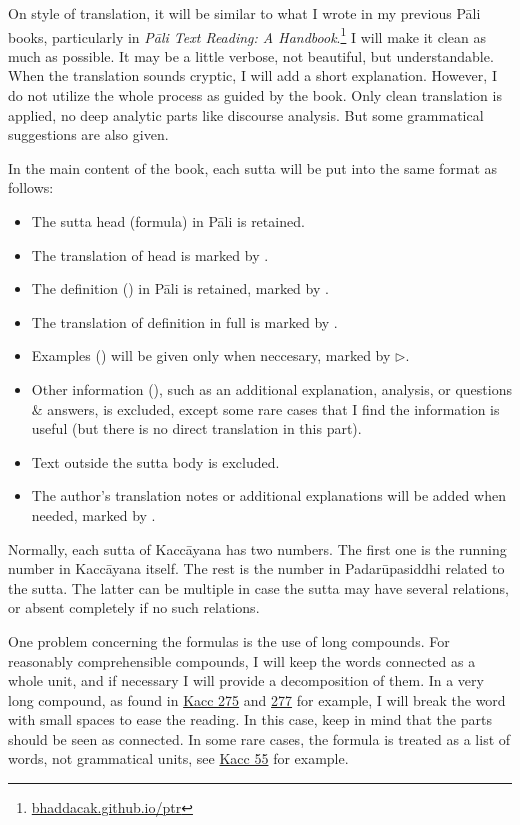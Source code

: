 On style of translation, it will be similar to what I wrote in my previous Pāli books, particularly in \emph{Pāli Text Reading: A Handbook}.\footnote{\url{bhaddacak.github.io/ptr}} I will make it clean as much as possible. It may be a little verbose, not beautiful, but understandable. When the translation sounds cryptic, I will add a short explanation. However, I do not utilize the whole process as guided by the book. Only clean translation is applied, no deep analytic parts like discourse analysis. But some grammatical suggestions are also given.

In the main content of the book, each sutta will be put into the same format as follows:

\begin{itemize}
\item The sutta head (formula) in Pāli is retained.
\item The translation of head is marked by \faHeart[regular].
\item The definition () in Pāli is retained, marked by \faAngleRight.
\item The translation of definition in full is marked by \faAngleDoubleRight.
\item Examples () will be given only when neccesary, marked by $\triangleright$.
\item Other information (), such as an additional explanation, analysis, or questions \& answers, is excluded, except some rare cases that I find the information is useful (but there is no direct translation in this part).
\item Text outside the sutta body is excluded.
\item The author's translation notes or additional explanations will be added when needed, marked by \faLightbulb[regular].
\end{itemize}

Normally, each sutta of Kaccāyana has two numbers. The first one is the running number in Kaccāyana itself. The rest is the number in Padarūpasiddhi related to the sutta. The latter can be multiple in case the sutta may have several relations, or absent completely if no such relations.

One problem concerning the formulas is the use of long compounds. For reasonably comprehensible compounds, I will keep the words connected as a whole unit, and if necessary I will provide a decomposition of them. In a very long compound, as found in \hyperref[sut:275]{Kacc 275} and \hyperref[sut:277]{277} for example, I will break the word with small spaces to ease the reading. In this case, keep in mind that the parts should be seen as connected. In some rare cases, the formula is treated as a list of words, not grammatical units, see \hyperref[sut:55]{Kacc 55} for example.

